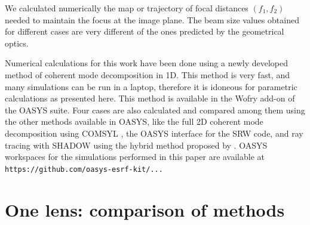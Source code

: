 \documentclass{iucr}              %
\begin{document}
We calculated numerically the map or trajectory of focal distances $(f_1,f_2)$ needed to maintain the focus at the image plane. The beam size values obtained for different cases are very different of the ones predicted by the geometrical optics.  

Numerical calculations for this work have been done using a newly developed method of coherent mode decomposition in 1D. This method is very fast, and many simulations can be run in a laptop, therefore it is idoneous for parametric calculations as presented here. This method is available in the Wofry add-on of the OASYS\cite{codeOASYS} suite. Four cases are also calculated and compared among them using the other methods available in OASYS, like the full 2D coherent mode decomposition using COMSYL \cite{codeCOMSYL}, the OASYS interface for the SRW \cite{codeSRW} code, and ray tracing with SHADOW\cite{codeSHADOW} using the hybrid method proposed by \cite{codeHYBRID}. OASYS workspaces for the simulations performed in this paper are available at {\tt https://github.com/oasys-esrf-kit/...} 





\newpage

\appendix



\section{One lens: comparison of methods}
\label{appendix:comparison}
\end{document}
